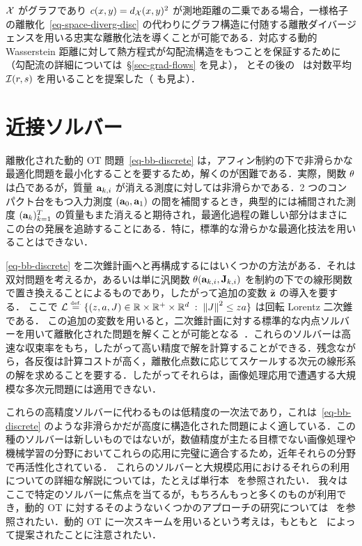\begin{rem}[グラフ上の動的定式化]
$\mathcal{X}$ がグラフであり $c(x,y)=d_{\mathcal{X}}(x,y)^2$ が測地距離の二乗である場合，一様格子の離散化~\eqref{eq-space-diverg-disc} の代わりにグラフ構造に付随する離散ダイバージェンスを用いる忠実な離散化法を導くことが可能である．対応する動的 Wasserstein 距離に対して熱方程式が勾配流構造をもつことを保証するために（勾配流の詳細については~\S\ref{sec-grad-flows} を見よ），\citet{Maas2011} とその後の~\citet{MielkeCVPDE} は対数平均 $\mathcal{I}(r,s)$ を用いることを提案した（\citep{solomon2016continuous,ChowHuangLiZhou2012,chow2017entropy,chow2017discrete} も見よ）．
\end{rem}

\section{近接ソルバー}
\label{sec-prox-solvers}

離散化された動的 OT 問題~\eqref{eq-bb-discrete} は，アフィン制約の下で非滑らかな最適化問題を最小化することを要するため，解くのが困難である．実際，関数 $\theta$ は凸であるが，質量 $\mathrm{\textbf{a}}_{k,i}$ が消える測度に対しては非滑らかである．2 つのコンパクト台をもつ入力測度 $(\mathrm{\textbf{a}}_0,\mathrm{\textbf{a}}_1)$ の間を補間するとき，典型的には補間された測度 $(\mathrm{\textbf{a}}_{k})_{k=1}^T$ の質量もまた消えると期待され，最適化過程の難しい部分はまさにこの台の発展を追跡することにある．特に，標準的な滑らかな最適化技法を用いることはできない．

\eqref{eq-bb-discrete} を二次錐計画へと再構成するにはいくつかの方法がある．それは双対問題を考えるか，あるいは単に汎関数 $\theta( \mathrm{\textbf{a}}_{k,i}, \mathrm{\textbf{J}}_{k,i} )$ を制約の下での線形関数
で置き換えることによるものであり，したがって追加の変数 $\tilde {\mathrm{\textbf{z}}}$ の導入を要する．
%
ここで $\mathcal{L} \stackrel{\mbox{\upshape\tiny def.}}{=} \{  (z,a,J) \in \mathbb{R} \times \mathbb{R}^+ \times \mathbb{R}^d  \;:\;  \left\| J \right\|^2 \leq z a  \}$ は回転 Lorentz 二次錐である．
%
この追加の変数を用いると，二次錐計画に対する標準的な内点ソルバーを用いて離散化された問題を解くことが可能となる~\citep{nesterov1994interior}．これらのソルバーは高速な収束率をもち，したがって高い精度で解を計算することができる．残念ながら，各反復は計算コストが高く，離散化点数に応じてスケールする次元の線形系の解を求めることを要する．したがってそれらは，画像処理応用で遭遇する大規模な多次元問題には適用できない．

これらの高精度ソルバーに代わるものは低精度の一次法であり，これは~\eqref{eq-bb-discrete} のような非滑らかだが高度に構造化された問題によく適している．この種のソルバーは新しいものではないが，数値精度が主たる目標でない画像処理や機械学習の分野においてこれらの応用に完璧に適合するため，近年それらの分野で再活性化されている．
%
これらのソルバーと大規模応用におけるそれらの利用についての詳細な解説については，たとえば単行本~\citep{BauschkeCombettes11} を参照されたい．
%
我々はここで特定のソルバーに焦点を当てるが，もちろんもっと多くのものが利用でき，動的 OT に対するそのようないくつかのアプローチの研究については~\citep{FPapPeyOud13} を参照されたい．動的 OT に一次スキームを用いるという考えは，もともと~\citet{benamou2000computational} によって提案されたことに注意されたい．

